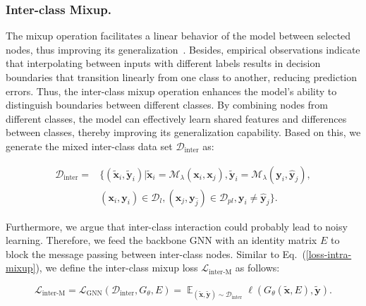 \documentclass[letterpaper]{article} %
\newcommand{\labeledset}{\mathcal{D}_{l}}
\newcommand{\aVec}[1]{\mathbf{#1}}
\newcommand{\interset}{\mathcal{D}_{\text{inter}}}
\DeclareMathOperator*{\expectation}{\mathbb{E}}
\begin{document}
\subsubsection{Inter-class Mixup.}
The mixup operation facilitates a linear behavior of the model between selected nodes, thus improving its generalization~\cite{mixup}. Besides, empirical observations indicate that interpolating between inputs with different labels results in decision boundaries that transition linearly from one class to another, reducing prediction errors. Thus, the inter-class mixup operation enhances the model's ability to distinguish boundaries between different classes. By combining nodes from different classes, the model can effectively learn shared features and differences between classes, thereby improving its generalization capability. Based on this, we generate the mixed inter-class data set $\interset$ as:
\begin{small}
	\begin{equation}
	\label{D-inter}
	\begin{split}
		 \interset = &\{(\tilde{\aVec{x}}_{i}, \tilde{\aVec{y}}_{i} )|\tilde{\aVec{x}}_{i} = \mathcal{M}_{\lambda}(\aVec{x}_{i}, \aVec{x}_{j}),  \tilde{\aVec{y}}_{i} = \mathcal{M}_{\lambda}(\aVec{y}_{i}, \aVec{\hat{y}}_{j}), \\
		 &(\aVec{x}_{i}, \aVec{y}_{i}) \in \labeledset, (\aVec{x}_{j}, \aVec{y}_{\hat{j}}) \in \mathcal{D}_{pl}, \aVec{y}_{i} \neq \aVec{\hat{y}}_{j}\}.
	\end{split}
	\end{equation}
\end{small}Furthermore, we argue that inter-class interaction could probably lead to noisy learning. Therefore, we feed the backbone GNN with an identity matrix $E$ to block the message passing between inter-class nodes. Similar to Eq.~(\ref{loss-intra-mixup}), we define the inter-class mixup loss $\mathcal{L}_{\text{inter-M}}$ as follows:
\begin{small}
	\begin{equation}
	\label{loss-inter-mixup}
		\mathcal{L}_{\text{inter-M}} = \mathcal{L}_{\text{GNN}} (\interset, G_{\theta}, E) = \expectation_{(\tilde{\aVec{x}}, \tilde{\aVec{y}}) \sim \interset} \ell(G_{\theta}(\tilde{\aVec{x}}, E), \tilde{\aVec{y}}).
	\end{equation}
\end{small}
\end{document}
